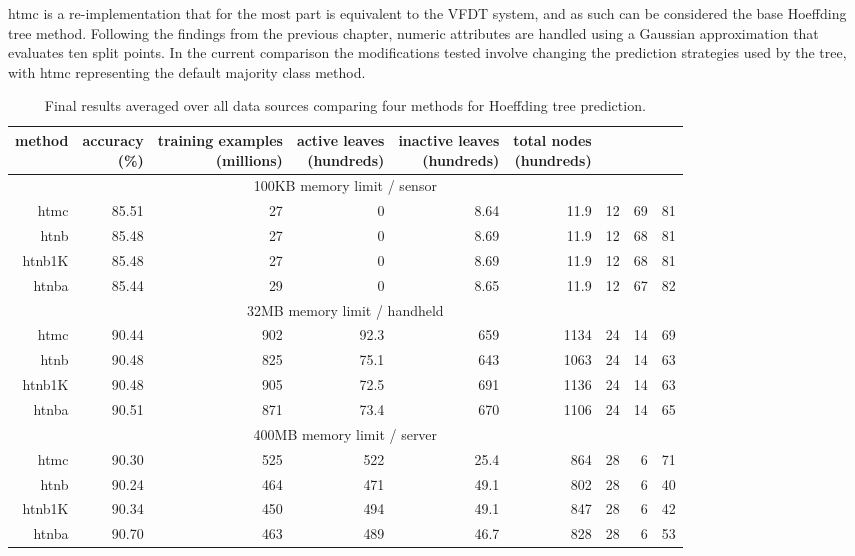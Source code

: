 {\sc htmc} is a re-implementation that for the most part is equivalent to the VFDT system, and as such can be considered the base Hoeffding tree method. Following the findings from the previous chapter, numeric attributes are handled using a Gaussian approximation that evaluates ten split points.
In the current comparison the modifications tested involve changing the prediction strategies used by the tree, with {\sc htmc} representing the default majority class method.

\begin{table}
\caption{Final results averaged over all data sources comparing four methods for Hoeffding tree prediction.}
\label{tab:leafavgs}
\centering
\begin{tabular}{|r|r|r|r|r|r|r|r|r|}
\hline
method	&
\rotatebox{90}{\parbox{9em}{accuracy\\(\%)}} &
\rotatebox{90}{\parbox{9em}{training examples\\(millions)}} &
\rotatebox{90}{\parbox{9em}{active leaves\\(hundreds)}} &
\rotatebox{90}{\parbox{9em}{inactive leaves\\(hundreds)}} &
\rotatebox{90}{\parbox{9em}{total nodes\\(hundreds)}} &
\rotatebox{90}{\parbox{9em}{tree depth}}	&
\rotatebox{90}{\parbox{9em}{training speed (\%)}} &
\rotatebox{90}{\parbox{9em}{prediction speed (\%)}} \\
\hline
\multicolumn{9}{|c|}{100KB memory limit / sensor} \\
\hline
{\sc htmc} & 85.51 & 27 & 0 & 8.64 & 11.9 & 12 & 69 & 81 \\
{\sc htnb} & 85.48 & 27 & 0 & 8.69 & 11.9 & 12 & 68 & 81 \\
{\sc htnb1K} & 85.48 & 27 & 0 & 8.69 & 11.9 & 12 & 68 & 81 \\
{\sc htnba} & 85.44 & 29 & 0 & 8.65 & 11.9 & 12 & 67 & 82 \\
\hline
\multicolumn{9}{|c|}{32MB memory limit / handheld} \\
\hline
{\sc htmc} & 90.44 & 902 & 92.3 & 659 & 1134 & 24 & 14 & 69 \\
{\sc htnb} & 90.48 & 825 & 75.1 & 643 & 1063 & 24 & 14 & 63 \\
{\sc htnb1K} & 90.48 & 905 & 72.5 & 691 & 1136 & 24 & 14 & 63 \\
{\sc htnba} & 90.51 & 871 & 73.4 & 670 & 1106 & 24 & 14 & 65 \\
\hline
\multicolumn{9}{|c|}{400MB memory limit / server} \\
\hline
{\sc htmc} & 90.30 & 525 & 522 & 25.4 & 864 & 28 & 6 & 71 \\
{\sc htnb} & 90.24 & 464 & 471 & 49.1 & 802 & 28 & 6 & 40 \\
{\sc htnb1K} & 90.34 & 450 & 494 & 49.1 & 847 & 28 & 6 & 42 \\
{\sc htnba} & 90.70 & 463 & 489 & 46.7 & 828 & 28 & 6 & 53 \\
\hline
\end{tabular}
\end{table}

